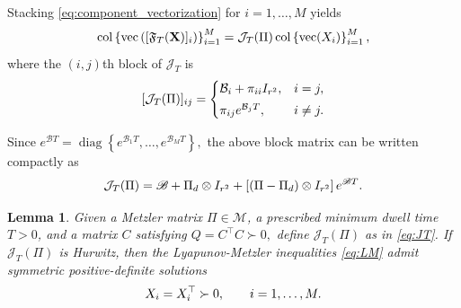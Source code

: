 \documentclass[conference]{IEEEtran}
\newtheorem{lemma}{Lemma}
\begin{document}
	Stacking \eqref{eq:component_vectorization} for
	$i=1,\ldots,M$ yields
	\vspace{-0.2\baselineskip}
	\begin{equation}
		\operatorname{col}
		\left\{
		\operatorname{vec}
		\left(
		[\mathfrak F_T(\mathbf X)]_i
		\right)
		\right\}_{i=1}^{M}
		=
		\mathcal J_T(\Pi)
		\operatorname{col}
		\left\{
		\operatorname{vec}(X_i)
		\right\}_{i=1}^{M},		
		\label{eq:stacked_operator}
		\vspace{-0.2\baselineskip}
	\end{equation}
	where the $(i,j)$th block of $\mathcal J_T$ is
	\vspace{-0.2\baselineskip}
	\[
	[\mathcal J_T(\Pi)]_{ij}
	=
	\begin{cases}
		\mathcal B_i+\pi_{ii}I_{r^2},
		& i=j,\\[1mm]
		\pi_{ij}e^{\mathcal B_jT},
		& i\ne j.
	\end{cases}
	\vspace{-0.2\baselineskip}
	\]
	
	Since
	$
	e^{\mathscr BT}
	=
	\operatorname{diag}
	\left\{
	e^{\mathcal B_1T},
	\ldots,
	e^{\mathcal B_MT}
	\right\},
	$
	the above block matrix can be written compactly as
	\vspace{-0.2\baselineskip}
	\begin{equation}
		\mathcal J_T(\Pi)
		=
		\mathscr B
		+
		\Pi_d\otimes I_{r^2}
		+
		\left[
		(\Pi-\Pi_d)\otimes I_{r^2}
		\right]
		e^{\mathscr BT}.		
		\label{eq:JT}
		\vspace{-0.2\baselineskip}
	\end{equation}
	
	\begin{lemma}\label{lem:lifted_sufficient}
		Given a Metzler matrix $\Pi\in\mathcal M$, a prescribed minimum
		dwell time $T>0$, and a matrix $C$ satisfying
		$
		Q=C^\top C\succ0,
		$
		define $\mathcal J_T(\Pi)$ as in \eqref{eq:JT}. If $\mathcal J_T(\Pi)$
		is Hurwitz, then the Lyapunov-Metzler inequalities
		\eqref{eq:LM} admit symmetric positive-definite solutions
		\vspace{-0.2\baselineskip}
		\[
		X_i=X_i^\top\succ0,
		\qquad
		i=1,\ldots,M.		
		\vspace{-0.2\baselineskip}
		\]
	\end{lemma}
	
\end{document}
